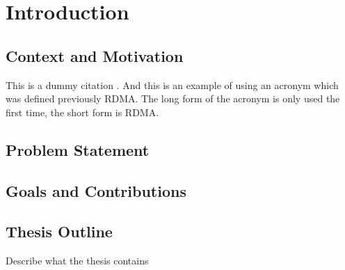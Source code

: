 \chapter{Introduction}
\label{chap:introduction}


\section{Context and Motivation}
\label{sec:context}
This is a dummy citation \cite{6651094}.
And this is an example of using an acronym which was defined previously \ac{RDMA}.
The long form of the acronym is only used the first time, the short form is \ac{RDMA}.

\blindtext

\section{Problem Statement}
\label{sec:problemStatment}

\section{Goals and Contributions}
\label{sec:goals}

\section{Thesis Outline}
\label{sec:outline}
Describe what the thesis contains
